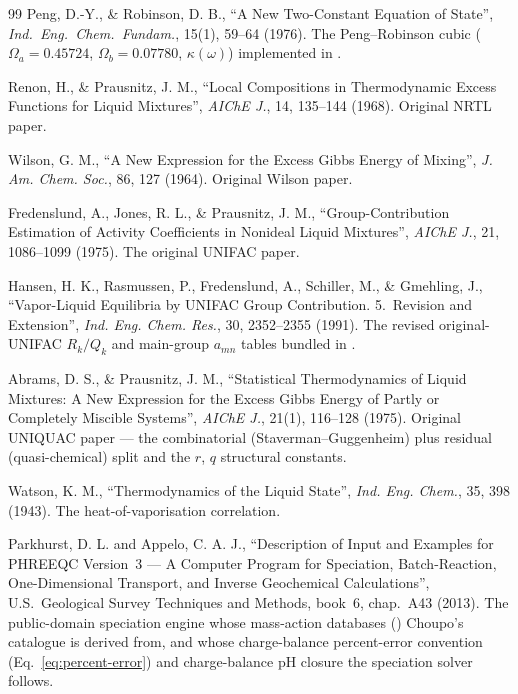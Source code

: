 \documentclass[11pt,a4paper]{article}
\begin{document}
\begin{thebibliography}{99}
 Peng, D.-Y., \& Robinson, D. B., ``A New
Two-Constant Equation of State'', \emph{Ind.\ Eng.\ Chem.\ Fundam.},
15(1), 59--64 (1976). The Peng--Robinson cubic ($\Omega_a = 0.45724$,
$\Omega_b = 0.07780$, $\kappa(\omega)$) implemented in .

 Renon, H., \& Prausnitz, J. M., ``Local Compositions in
Thermodynamic Excess Functions for Liquid Mixtures'', \emph{AIChE J.},
14, 135--144 (1968). Original NRTL paper.

 Wilson, G. M., ``A New Expression for the Excess
Gibbs Energy of Mixing'', \emph{J. Am. Chem. Soc.}, 86, 127 (1964).
Original Wilson paper.


 Fredenslund, A., Jones, R. L., \& Prausnitz,
J. M., ``Group-Contribution Estimation of Activity Coefficients in
Nonideal Liquid Mixtures'', \emph{AIChE J.}, 21, 1086--1099 (1975). The
original UNIFAC paper.


 Hansen, H. K., Rasmussen, P., Fredenslund, A.,
Schiller, M., \& Gmehling, J., ``Vapor-Liquid Equilibria by UNIFAC Group
Contribution. 5.\ Revision and Extension'', \emph{Ind. Eng. Chem. Res.},
30, 2352--2355 (1991). The revised original-UNIFAC $R_k/Q_k$ and
main-group $a_{mn}$ tables bundled in .

 Abrams, D. S., \& Prausnitz, J. M., ``Statistical
Thermodynamics of Liquid Mixtures: A New Expression for the Excess Gibbs
Energy of Partly or Completely Miscible Systems'', \emph{AIChE J.},
21(1), 116--128 (1975). Original UNIQUAC paper --- the combinatorial
(Staverman--Guggenheim) plus residual (quasi-chemical) split and the
$r$, $q$ structural constants.

 Watson, K. M., ``Thermodynamics of the Liquid State'',
\emph{Ind. Eng. Chem.}, 35, 398 (1943). The heat-of-vaporisation
correlation.

 Parkhurst, D. L. and Appelo, C. A. J., ``Description of Input and Examples for PHREEQC Version~3 --- A Computer Program for Speciation, Batch-Reaction, One-Dimensional Transport, and Inverse Geochemical Calculations'', U.S.\ Geological Survey Techniques and Methods, book~6, chap.~A43 (2013). The public-domain speciation engine whose mass-action databases () Choupo's  catalogue is derived from, and whose charge-balance percent-error convention (Eq.~\ref{eq:percent-error}) and charge-balance pH closure the speciation solver follows.


\end{thebibliography}
\end{document}
